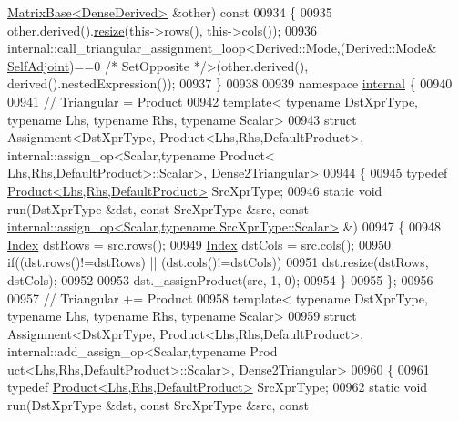 \begin{DoxyCode}
      \hyperlink{group___core___module_class_eigen_1_1_matrix_base}{MatrixBase<DenseDerived>} &other)\textcolor{keyword}{ const}
00934 \textcolor{keyword}{}\{
00935   other.derived().\hyperlink{group___core___module_a13027a493a68a13496610caf3d81bd3e}{resize}(this->rows(), this->cols());
00936   internal::call\_triangular\_assignment\_loop<Derived::Mode,(Derived::Mode&
      \hyperlink{group__enums_gga39e3366ff5554d731e7dc8bb642f83cda2491fc6765056421f504eb7e16083e8f}{SelfAdjoint})==0 \textcolor{comment}{/* SetOpposite */}>(other.derived(), derived().nestedExpression());
00937 \}
00938 
00939 \textcolor{keyword}{namespace }\hyperlink{namespaceinternal}{internal} \{
00940   
00941 \textcolor{comment}{// Triangular = Product}
00942 \textcolor{keyword}{template}< \textcolor{keyword}{typename} DstXprType, \textcolor{keyword}{typename} Lhs, \textcolor{keyword}{typename} Rhs, \textcolor{keyword}{typename} Scalar>
00943 \textcolor{keyword}{struct }Assignment<DstXprType, Product<Lhs,Rhs,DefaultProduct>, internal::assign\_op<Scalar,typename Product<
      Lhs,Rhs,DefaultProduct>::Scalar>, Dense2Triangular>
00944 \{
00945   \textcolor{keyword}{typedef} \hyperlink{group___core___module_class_eigen_1_1_product}{Product<Lhs,Rhs,DefaultProduct>} SrcXprType;
00946   \textcolor{keyword}{static} \textcolor{keywordtype}{void} run(DstXprType &dst, \textcolor{keyword}{const} SrcXprType &src, \textcolor{keyword}{const} 
      \hyperlink{struct_eigen_1_1internal_1_1assign__op}{internal::assign\_op<Scalar,typename SrcXprType::Scalar>}
       &)
00947   \{
00948     \hyperlink{group___core___module_a554f30542cc2316add4b1ea0a492ff02}{Index} dstRows = src.rows();
00949     \hyperlink{group___core___module_a554f30542cc2316add4b1ea0a492ff02}{Index} dstCols = src.cols();
00950     \textcolor{keywordflow}{if}((dst.rows()!=dstRows) || (dst.cols()!=dstCols))
00951       dst.resize(dstRows, dstCols);
00952 
00953     dst.\_assignProduct(src, 1, 0);
00954   \}
00955 \};
00956 
00957 \textcolor{comment}{// Triangular += Product}
00958 \textcolor{keyword}{template}< \textcolor{keyword}{typename} DstXprType, \textcolor{keyword}{typename} Lhs, \textcolor{keyword}{typename} Rhs, \textcolor{keyword}{typename} Scalar>
00959 \textcolor{keyword}{struct }Assignment<DstXprType, Product<Lhs,Rhs,DefaultProduct>, internal::add\_assign\_op<Scalar,typename Prod
      uct<Lhs,Rhs,DefaultProduct>::Scalar>, Dense2Triangular>
00960 \{
00961   \textcolor{keyword}{typedef} \hyperlink{group___core___module_class_eigen_1_1_product}{Product<Lhs,Rhs,DefaultProduct>} SrcXprType;
00962   \textcolor{keyword}{static} \textcolor{keywordtype}{void} run(DstXprType &dst, \textcolor{keyword}{const} SrcXprType &src, \textcolor{keyword}{const} 

\end{DoxyCode}
